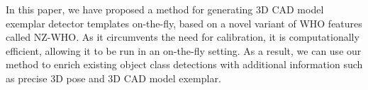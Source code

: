 In this paper, we have proposed a method for generating 3D CAD model
exemplar detector templates on-the-fly, based on a novel variant of
WHO features called NZ-WHO. As it circumvents the need for
calibration, it is computationally efficient, allowing it to be run in
an on-the-fly setting. As a result, we can use our method to enrich
existing object class detections with additional information such as
precise 3D pose and 3D CAD model exemplar.